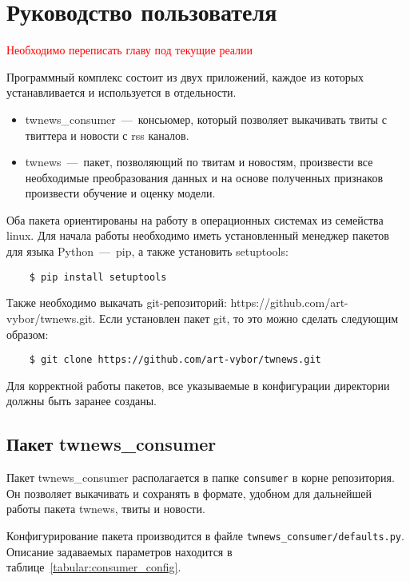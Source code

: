 \section{Руководство пользователя}
    \textcolor{red}{Необходимо переписать главу под текущие реалии}

    Программный комплекс состоит из двух приложений, каждое из которых устанавливается и используется в отдельности.
    \begin{itemize}
        \item twnews\_consumer~---~консьюмер, который позволяет выкачивать твиты с твиттера и новости с rss каналов.
        \item twnews~---~пакет, позволяющий по твитам и новостям, произвести все необходимые преобразования данных и на основе полученных признаков произвести обучение и оценку модели.
    \end{itemize}

    Оба пакета ориентированы на работу в операционных системах из семейства linux. Для начала работы необходимо иметь установленный менеджер пакетов для языка Python~---~pip, а также установить setuptools:
    \begin{lstlisting}
    $ pip install setuptools
    \end{lstlisting}
    Также необходимо выкачать git-репозиторий: https://github.com/art-vybor/twnews.git.
    Если установлен пакет git, то это можно сделать следующим образом:
    \begin{lstlisting}
    $ git clone https://github.com/art-vybor/twnews.git
    \end{lstlisting}

    Для корректной работы пакетов, все указываемые в конфигурации директории должны быть заранее созданы.

    \subsection{Пакет twnews\_consumer}
        Пакет twnews\_consumer располагается в папке \lstinline{consumer} в корне репозитория.
        Он позволяет выкачивать и сохранять в формате, удобном для дальнейшей работы пакета twnews, твиты и новости.

        Конфигурирование пакета производится в файле \lstinline{twnews_consumer/defaults.py}.
        Описание задаваемых параметров находится в таблице~\ref{tabular:consumer_config}.

